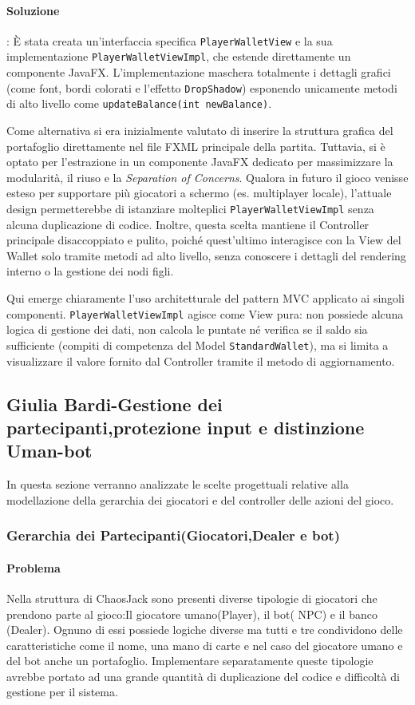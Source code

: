 \documentclass[a4paper,12pt]{report}
\begin{document}
\paragraph{Soluzione} : È stata creata un'interfaccia specifica \texttt{PlayerWalletView} e la sua implementazione \texttt{PlayerWalletViewImpl}, che estende direttamente un componente JavaFX. L'implementazione maschera totalmente i dettagli grafici (come font, bordi colorati e l'effetto \texttt{DropShadow}) esponendo unicamente metodi di alto livello come \texttt{updateBalance(int newBalance)}.

Come alternativa si era inizialmente valutato di inserire la struttura grafica del portafoglio direttamente nel file FXML principale della partita. Tuttavia, si è optato per l'estrazione in un componente JavaFX dedicato per massimizzare la modularità, il riuso e la \textit{Separation of Concerns}. Qualora in futuro il gioco venisse esteso per supportare più giocatori a schermo (es. multiplayer locale), l'attuale design permetterebbe di istanziare molteplici \texttt{PlayerWalletViewImpl} senza alcuna duplicazione di codice. Inoltre, questa scelta mantiene il Controller principale disaccoppiato e pulito, poiché quest'ultimo interagisce con la View del Wallet solo tramite metodi ad alto livello, senza conoscere i dettagli del rendering interno o la gestione dei nodi figli.

Qui emerge chiaramente l'uso architetturale del pattern MVC applicato ai singoli componenti. \texttt{PlayerWalletViewImpl} agisce come View pura: non possiede alcuna logica di gestione dei dati, non calcola le puntate né verifica se il saldo sia sufficiente (compiti di competenza del Model \texttt{StandardWallet}), ma si limita a visualizzare il valore fornito dal Controller tramite il metodo di aggiornamento.

\subsection*{Giulia Bardi-Gestione dei partecipanti,protezione input e distinzione Uman-bot }
In questa sezione verranno analizzate le scelte progettuali relative alla modellazione della gerarchia dei giocatori e del controller delle azioni del gioco.

\subsubsection*{Gerarchia dei Partecipanti(Giocatori,Dealer e bot)}

\paragraph*{Problema}
Nella struttura di ChaosJack sono presenti diverse tipologie di giocatori che prendono parte al gioco:Il giocatore umano(Player), il bot( NPC) e il banco (Dealer).
Ognuno di essi possiede logiche diverse ma tutti e tre condividono delle caratteristiche come il nome, una mano di carte e nel caso del giocatore umano e del bot anche un portafoglio.
Implementare separatamente queste tipologie avrebbe portato ad una grande quantità di duplicazione del codice e difficoltà di gestione per il sistema.
\end{document}
